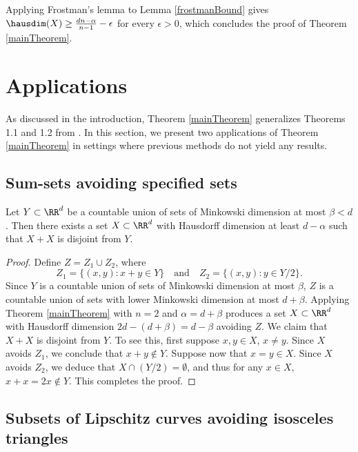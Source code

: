 Applying Frostman's lemma to Lemma \ref{frostmanBound} gives $\hausdim(X) \geq \frac{dn - \alpha}{n - 1} - \epsilon$ for every $\epsilon>0$, which concludes the proof of Theorem \ref{mainTheorem}.









\section{Applications}\label{applications}

As discussed in the introduction, Theorem \ref{mainTheorem} generalizes Theorems 1.1 and 1.2 from \cite{MalabikaRob}. In this section, we present two applications of Theorem \ref{mainTheorem} in settings where previous methods do not yield any results.

\subsection{Sum-sets avoiding specified sets}

\begin{theorem} \label{sumset-application} 
	Let $Y \subset \RR^d$ be a countable union of sets of Minkowski dimension at most $\beta < d$. Then there exists a set $X \subset \RR^d$ with Hausdorff dimension at least $d - \alpha$ such that $X + X$ is disjoint from $Y$.
\end{theorem}
\begin{proof}
	Define $Z = Z_1 \cup Z_2$, where
	\[ Z_1 = \{ (x,y) : x + y \in Y \} \quad \text{and} \quad Z_2 = \{ (x,y): y \in Y/2 \}. \]
	Since $Y$ is a countable union of sets of Minkowski dimension at most $\beta$, $Z$ is a countable union of sets with lower Minkowski dimension at most $d + \beta$. Applying Theorem \ref{mainTheorem} with $n = 2$ and $\alpha = d + \beta$ produces a set $X \subset \RR^d$ with Hausdorff dimension $2d  - (d + \beta) = d - \beta$ avoiding $Z$. We claim that $X+ X$ is disjoint from $Y$. To see this, first suppose $x, y \in X$, $x \ne y$. Since $X$ avoids $Z_1$, we conclude that $x + y \not \in Y$. Suppose now that $x = y \in X$. Since $X$ avoids $Z_2$, we deduce that $X \cap (Y/2) = \emptyset$, and thus for any $x \in X$, $x + x = 2x \not \in Y$. This completes the proof. 
\end{proof}


\subsection{Subsets of Lipschitz curves avoiding isosceles triangles}

